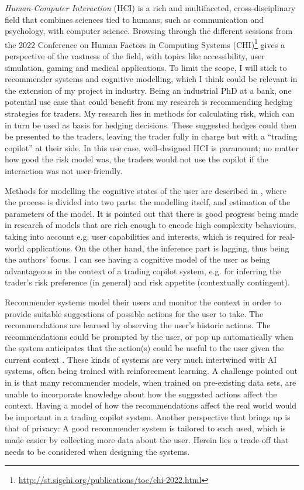 \documentclass[11pt]{article}
\begin{document}
\textit{Human-Computer Interaction} (HCI) is a rich and multifaceted, cross-disciplinary field that combines sciences tied to humans, such as communication and psychology, with computer science. Browsing through the different sessions from the 2022 Conference on Human Factors in Computing Systems (CHI)\footnote{\url{http://st.sigchi.org/publications/toc/chi-2022.html}} gives a perspective of the vastness of the field, with topics like accessibility, user simulation, gaming and medical applications. To limit the scope, I will stick to recommender systems and cognitive modelling, which I think could be relevant in the extension of my project in industry. Being an industrial PhD at a bank, one potential use case that could benefit from my research is recommending hedging strategies for traders. My research lies in methods for calculating risk, which can in turn be used as basis for hedging decisions. These suggested hedges could then be presented to the traders, leaving the trader fully in charge but with a ``trading copilot'' at their side. In this use case, well-designed HCI is paramount; no matter how good the risk model was, the traders would not use the copilot if the interaction was not user-friendly.

Methods for modelling the cognitive states of the user are described in \cite{kangasraasio2017abc}, where the process is divided into two parts: the modelling itself, and estimation of the parameters of the model. It is pointed out that there is good progress being made in research of models that are rich enough to encode high complexity behaviours, taking into account e.g. user capabilities and interests, which is required for real-world applications. On the other hand, the inference part is lagging, thus being the authors' focus. I can see having a cognitive model of the user as being advantageous in the context of a trading copilot system, e.g. for inferring the trader's risk preference (in general) and risk appetite (contextually contingent).

Recommender systems model their users and monitor the context in order to provide suitable suggestions of possible actions for the user to take. The recommendations are learned by observing the user's historic actions. The recommendations could be prompted by the user, or pop up automatically when the system anticipates that the action(s) could be useful to the user given the current context \cite{jacucci2021}. These kinds of systems are very much intertwined with AI systems, often being trained with reinforcement learning. A challenge pointed out in \cite{jacucci2021} is that many recommender models, when trained on pre-existing data sets, are unable to incorporate knowledge about how the suggested actions affect the context. Having a model of how the recommendations affect the real world would be important in a trading copilot system. Another perspective that \cite{jacucci2021} brings up is that of privacy: A good recommender system is tailored to each used, which is made easier by collecting more data about the user. Herein lies a trade-off that needs to be considered when designing the systems.
\end{document}
